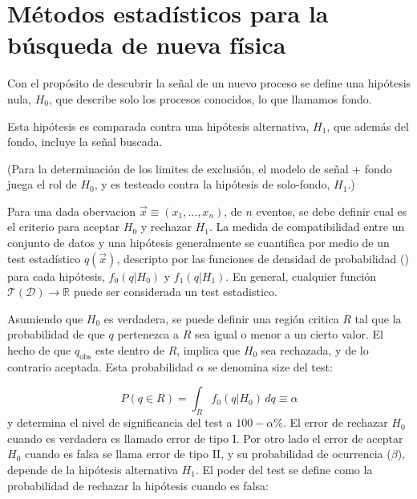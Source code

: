 \chapter{M\'etodos estad\'isticos para la b\'usqueda de nueva f\'isica}



Con el propósito de descubrir la se\~nal de un nuevo proceso se define una hipótesis nula,
$H_0$, que describe solo los procesos conocidos, lo que llamamos fondo.

Esta hipótesis es comparada contra una hipótesis alternativa, $H_1$, que además del fondo, incluye
la se\~nal buscada.

(Para la determinación de los limites de exclusión, el modelo de señal + fondo  juega el rol de
$H_0$, y es testeado contra la hipótesis de solo-fondo, $H_1$.)

Para una dada obervacion $\vec{x} \equiv (x_1, ..., x_n)$, de $n$ eventos, se debe definir cual es
el criterio para aceptar $H_0$ y rechazar $H_1$. La medida de compatibilidad entre un conjunto de
datos y una hipótesis generalmente se cuantifica por medio de un test estadístico $q(\vec{x})$,
descripto por las funciones de densidad de probabilidad (\pdf) para cada hipótesis, $f_0(q|H_0)$ y
$f_1(q|H_1)$.
En general, cualquier función $\mathcal{T}(\mathcal{D}) \rightarrow \mathbb{R}$ puede ser considerada
un test estadistico.

Asumiendo que $H_0$ es verdadera, se puede definir una región critica $R$ tal que la probabilidad
de que $q$ pertenezca a $R$ sea igual o menor a un cierto valor. El hecho de que $q_\text{obs}$
este dentro de $R$, implica que $H_0$ sea rechazada, y de lo contrario aceptada. Esta probabilidad
$\alpha$ se denomina size del test:

\begin{equation}
  P(q \in R) = \int_R f_0(q|H_0)\, dq \equiv \alpha
\end{equation}
%
y determina el nivel de significancia del test a $100 - \alpha \%$. El error de rechazar $H_0$ cuando
es verdadera es llamado error de tipo I. Por otro lado el error de aceptar $H_0$ cuando es falsa se
llama error de tipo II, y su probabilidad de ocurrencia ($\beta$), depende de la hipótesis
alternativa $H_1$. El poder del test se define como la probabilidad de rechazar la hipótesis cuando
es falsa:

